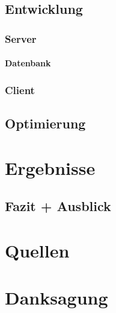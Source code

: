 \documentclass[a4paper,12pt,ngerman]{scrreport}
\begin{document}
    \section{Entwicklung}
    \subsection{Server}
    \subsubsection{Datenbank}
    \subsection{Client}
    \section{Optimierung}


    \chapter{Ergebnisse}

    \section{Fazit + Ausblick}

    \chapter{Quellen}
    \chapter{Danksagung}
\end{document}
